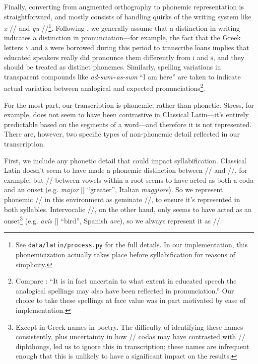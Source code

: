 \documentclass[12pt,twoside]{article}
\newcommand{\ipa}[1]{/\textipa{#1}/}
\newcommand{\ipab}[1]{[\textipa{#1}]}
\begin{document}

Finally, converting from augmented orthography to phonemic representation is straightforward, and mostly consists of handling quirks of the writing system like \emph{x} \ipa{ks} and \emph{qu} \ipa{k\super{w}}\footnote{See \texttt{data/latin/process.py} for the full details. In our implementation, this phonemicization actually takes place before syllabification for reasons of simplicity.}. Following \citet{allen}, we generally assume that a distinction in writing indicates a distinction in pronunciation---for example, the fact that the Greek letters \textsc{y} and \textsc{z} were borrowed during this period to transcribe loans implies that educated speakers really did pronounce them differently from \textsc{i} and \textsc{s}, and they should be treated as distinct phonemes. Similarly, spelling variations in transparent compounds like \emph{ad-sum}\textasciitilde\emph{as-sum} ``I am here'' are taken to indicate actual variation between analogical and expected pronunciations\footnote{Compare \citet[22]{allen}: ``It is in fact uncertain to what extent in educated speech the analogical spellings may also have been reflected in pronunciation.'' Our choice to take these spellings at face value was in part motivated by ease of implementation.}.

For the most part, our transcription is phonemic, rather than phonetic. Stress, for example, does not seem to have been contrastive in Classical Latin---it's entirely predictable based on the segments of a word---and therefore it is not represented. There are, however, two specific types of non-phonemic detail reflected in our transcription.

First, we include any phonetic detail that could impact syllabification. Classical Latin doesn't seem to have made a phonemic distinction between \ipa{j} and \ipa{jj}, for example, but \ipa{j} between vowels within a root seems to have acted as both a coda and an onset (e.g. \emph{major} \ipab{maj.jor} ``greater'', Italian \emph{maggiore}). So we represent phonemic \ipa{j} in this environment as geminate \ipa{jj}, to ensure it's represented in both syllables. Intervocalic \ipa{w}, on the other hand, only seems to have acted as an onset\footnote{Except in Greek names in poetry. The difficulty of identifying these names consistently, plus uncertainty in how \ipa{w} codas may have contrasted with \ipa{Vw} diphthongs, led us to ignore this in transcription; these names are infrequent enough that this is unlikely to have a significant impact on the results.} (e.g. \emph{avis} \ipab{a.wis} ``bird'', Spanish \emph{ave}), so we always represent it as \ipa{w}.
\end{document}
